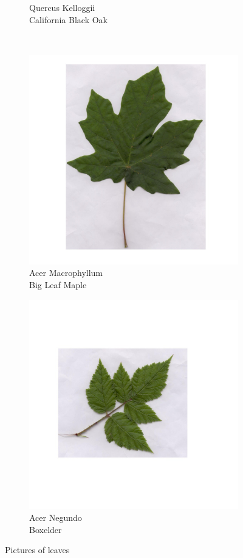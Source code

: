 \documentclass[12pt]{article}
\begin{document}
\begin{figure}[b!]
\begin{subfigure}[b]{0.3\textwidth}
\caption{Quercus Kelloggii\\California Black Oak}
\end{subfigure}\\
\begin{subfigure}[b]{0.3\textwidth}
\includegraphics[width=\textwidth]{macrophyllum_sample.jpg}
\caption{Acer Macrophyllum\\Big Leaf Maple}
\end{subfigure}
\begin{subfigure}[b]{0.3\textwidth}
\includegraphics[width=\textwidth]{negundo_sample.jpg}
\caption{Acer Negundo\\Boxelder}
\end{subfigure}
\caption{Pictures of leaves}
\end{figure}
\end{document}
